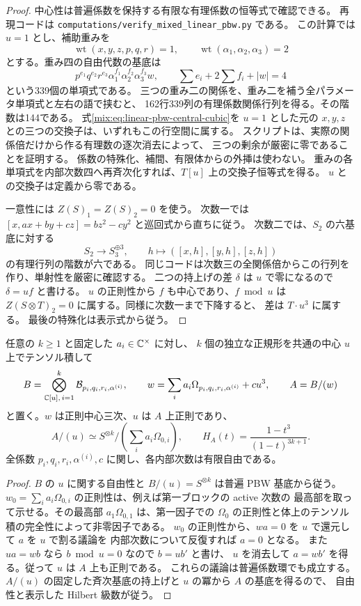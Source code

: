 \begin{proof}
中心性は普遍係数を保持する有限な有理係数の恒等式で確認できる。
再現コードは \texttt{computations/verify\_mixed\_linear\_pbw.py} である。
この計算では $u=1$ とし、補助重みを
\[
 \operatorname{wt}(x,y,z,p,q,r)=1,\qquad
 \operatorname{wt}(\alpha_1,\alpha_2,\alpha_3)=2
\]
とする。重み四の自由代数の基底は
\[
 p^{e_1}q^{e_2}r^{e_3}\alpha_1^{f_1}\alpha_2^{f_2}\alpha_3^{f_3}w,
 \qquad \sum e_i+2\sum f_i+|w|=4
\]
という339個の単項式である。
三つの重み二の関係を、重み二を補う全パラメータ単項式と左右の語で挟むと、
162行339列の有理係数関係行列を得る。その階数は144である。
式\eqref{mix:eq:linear-pbw-central-cubic}を $u=1$ とした元の
$x,y,z$ との三つの交換子は、いずれもこの行空間に属する。
スクリプトは、実際の関係倍だけから作る有理数の逐次消去によって、
三つの剰余が厳密に零であることを証明する。
係数の特殊化、補間、有限体からの外挿は使わない。
重みの各単項式を内部次数四へ再斉次化すれば、$T[u]$ 上の交換子恒等式を得る。
$u$ との交換子は定義から零である。

一意性には $Z(S)_1=Z(S)_2=0$ を使う。
次数一では $[x,ax+by+cz]=bz^2-cy^2$ と巡回式から直ちに従う。
次数二では、$S_2$ の六基底に対する
\[
 S_2\longrightarrow S_3^{\oplus3},\qquad
 h\longmapsto([x,h],[y,h],[z,h])
\]
の有理行列の階数が六である。
同じコードは次数三の全関係倍からこの行列を作り、単射性を厳密に確認する。
二つの持上げの差 $\delta$ は $u$ で零になるので $\delta=uf$ と書ける。
$u$ の正則性から $f$ も中心であり、$f\bmod u$ は
$Z(S\otimes T)_2=0$ に属する。同様に次数一まで下降すると、
差は $T\cdot u^3$ に属する。
最後の特殊化は表示式から従う。
\end{proof}

\begin{corollary}[多ブロックの実際の中心商]
\label{mix:cor:linear-pbw-multiblock-family}
任意の $k\ge1$ と固定した $a_i\in\mathbb C^\times$ に対し、
$k$ 個の独立な正規形を共通の中心 $u$ 上でテンソル積して
\[
 B=\bigotimes_{\mathbb C[u],\,i=1}^k\mathcal B_{p_i,q_i,r_i,\alpha^{(i)}},
 \qquad w=\sum_i a_i\Omega_{p_i,q_i,r_i,\alpha^{(i)}}+cu^3,
 \qquad A=B/(w)
\]
と置く。$w$ は正則中心三次、$u$ は $A$ 上正則であり、
\[
 A/(u)\simeq S^{\otimes k}/\left(\sum_i a_i\Omega_{0,i}\right),
 \qquad H_A(t)=\frac{1-t^3}{(1-t)^{3k+1}}.
\]
全係数 $p_i,q_i,r_i,\alpha^{(i)},c$ に関し、各内部次数は有限自由である。
\end{corollary}

\begin{proof}
$B$ の $u$ に関する自由性と $B/(u)=S^{\otimes k}$ は普遍 PBW 基底から従う。
$w_0=\sum_i a_i\Omega_{0,i}$ の正則性は、例えば第一ブロックの active 次数の
最高部を取って示せる。その最高部 $a_1\Omega_{0,1}$ は、第一因子での
$\Omega_0$ の正則性と体上のテンソル積の完全性によって非零因子である。
$w_0$ の正則性から、$wa=0$ を $u$ で還元して $a$ を $u$ で割る議論を
内部次数について反復すれば $a=0$ となる。
また $ua=wb$ なら $b\bmod u=0$ なので $b=ub'$ と書け、
$u$ を消去して $a=wb'$ を得る。従って $u$ は $A$ 上も正則である。
これらの議論は普遍係数環でも成立する。
$A/(u)$ の固定した斉次基底の持上げと $u$ の冪から $A$ の基底を得るので、
自由性と表示した Hilbert 級数が従う。
\end{proof}

